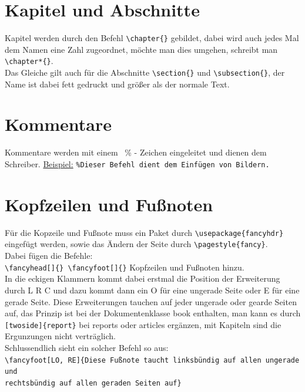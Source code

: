 \documentclass[ngerman]{scrreport}
\begin{document}
\section*{Kapitel und Abschnitte}
Kapitel werden durch den Befehl {\color{blue}\verb|\chapter{}|} gebildet, dabei wird auch jedes Mal dem Namen eine Zahl zugeordnet, möchte man dies umgehen, schreibt man {\color{blue}\verb|\chapter*{}|}.\\
Das Gleiche gilt auch für die Abschnitte {\color{blue}\verb|\section{}|} und {\color{blue}\verb|\subsection{}|}, der Name ist dabei fett gedruckt und größer als der normale Text.

\section*{Kommentare}
Kommentare werden mit einem {\color{blue}\ \%} - Zeichen eingeleitet und dienen dem Schreiber.
\newline
\underline{Beispiel:} {\color{blue}\verb|%Dieser Befehl dient dem Einfügen von Bildern.|}

\section*{Kopfzeilen und Fußnoten}
Für die Kopzeile und Fußnote muss ein Paket durch {\color{blue}\verb|\usepackage{fancyhdr}|} eingefügt werden, sowie das Ändern der Seite durch {\color{blue}\verb|\pagestyle{fancy}|}.\\
Dabei fügen die Befehle:\\
{\color{blue}\verb|\fancyhead[]{} \fancyfoot[]{}|} Kopfzeilen und Fußnoten hinzu.\\
In die eckigen Klammern kommt dabei erstmal die Position der Erweiterung durch {\color{blue}L R C} und dazu kommt dann ein {\color{blue}O} für eine ungerade Seite oder {\color{blue}E} für eine gerade Seite.
Diese Erweiterungen tauchen auf jeder ungerade oder gearde Seiten auf, das Prinzip ist bei der Dokumentenklasse book enthalten, man kann es durch {\color{blue}\verb|[twoside]{report}|} bei reports oder articles ergänzen, mit Kapiteln sind die Ergunzungen  nicht verträglich.\\
Schlussendlich sieht ein solcher Befehl so aus:\\
{\color{blue}\verb|\fancyfoot[LO, RE]{Diese Fußnote taucht linksbündig auf allen ungerade und|}\\
{\color{blue}\verb|rechtsbündig auf allen geraden Seiten auf}|}
\end{document}
